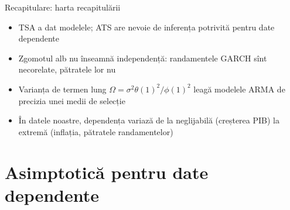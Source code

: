 \begin{frame}{Recapitulare: harta recapitulării}
\itemsize{\small}
\begin{itemize}
    \item TSA a dat modelele; ATS are nevoie de inferența potrivită pentru date dependente
    \item Zgomotul alb nu înseamnă independență: randamentele GARCH sînt necorelate, pătratele lor nu
    \item Varianța de termen lung $\Omega = \sigma^2\theta(1)^2/\phi(1)^2$ leagă modelele ARMA de precizia unei medii de selecție
    \item În datele noastre, dependența variază de la neglijabilă (creșterea PIB) la extremă (inflația, pătratele randamentelor)
\end{itemize}
\end{frame}


\section{Asimptotică pentru date dependente}

